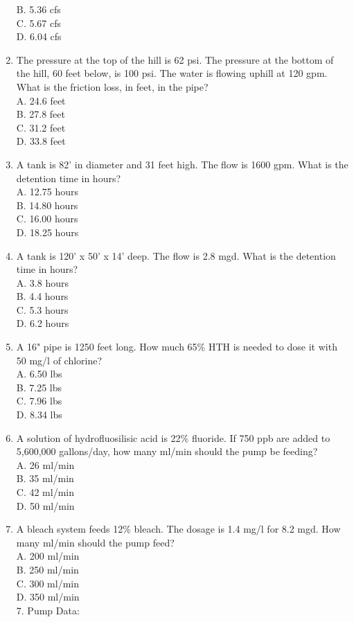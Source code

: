 \documentclass{article}
\begin{document}
\begin{enumerate}
B. 5.36 cfs\\
C. 5.67 cfs\\
D. 6.04 cfs\\
\item The pressure at the top of the hill is 62 psi. The pressure at the bottom of the hill, 60 feet below, is 100 psi. The water is flowing uphill at 120 gpm. What is the friction loss, in feet, in the pipe?\\
A. 24.6 feet\\
B. 27.8 feet\\
C. 31.2 feet\\
D. 33.8 feet\\
\item  A tank is 82' in diameter and 31 feet high. The flow is 1600 gpm. What is the detention time in hours?\\
A. 12.75 hours\\
B. 14.80 hours\\
C. 16.00 hours\\
D. 18.25 hours\\

\item A tank is 120' x 50' x 14' deep. The flow is 2.8 mgd.  What is the detention time in hours?\\
A. 3.8 hours\\
B. 4.4 hours\\
C. 5.3 hours\\
D. 6.2 hours\\

\item A 16" pipe is 1250 feet long. How much 65\% HTH is needed to dose it with 50 mg/l of chlorine?\\
A. 6.50 lbs\\
B. 7.25 lbs\\
C. 7.96 lbs\\
D. 8.34 lbs\\

\item A solution of hydrofluosilisic acid is 22\% fluoride. If 750 ppb are added to 5,600,000 gallons/day, how many ml/min should the pump be feeding?\\
A. 26 ml/min\\
B. 35 ml/min\\
C. 42 ml/min\\
D. 50 ml/min\\

\item A bleach system feeds 12\% bleach. The dosage is 1.4 mg/l for 8.2 mgd. How many ml/min should the pump feed?\\
A. 200 ml/min\\
B. 250 ml/min\\
C. 300 ml/min\\
D. 350 ml/min\\
7. Pump Data:\\


\end{enumerate}
\end{document}
